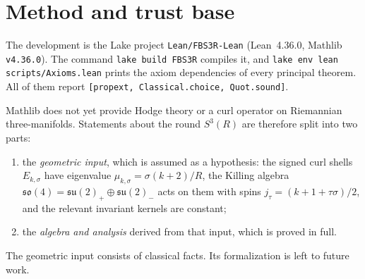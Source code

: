 \documentclass[11pt]{article}
\theoremstyle{remark}
\newcommand{\lean}[1]{\texttt{#1}}
\begin{document}
\begin{abstract}
\begin{itemize}
$F_{n+2}$;
\item the Casimir constant $1/240$ of the conformal scalar on $S^3$ from $\zeta(-3)=1/120$, and an
explicit Kretschmann bound at the Planck boundary;
\item the conformal sign of curvature barriers for Ricci-type flows and a sharp Ricci lower
bound $\mathrm{Ric}\ge-\sqrt{K_0/2}$ under $|\mathrm{Rm}|^2\le K_0$ in dimension three;
\item an energy bound excluding blow-up inside exact finite reducing spaces of quadratic
evolutions;
\item Hankel positivity, log-convexity and the sharp chiral bound $|\Xi|\le2/3$ for positive
spectral measures, and the exact dilation flow $A\,w'=-\mathrm{Var}/3\le0$ of positive
valuation mixtures;
\item the dust-plus-vacuum closure criterion, Einstein-static and turning-point algebra of
residual cosmology;
\item the exact Moore--Ran--Wen gap $\min_{s\in\{\pm1,\pm3\}}(s-m)^2$, the unique-selector
theorem, the angular rank count $N_L-N_{L-q}$, and the logical algebra of the AKLT plaquette
qutrit.
\end{itemize}
A per-paper coverage table classifies all 101 folders of the archive.
We also give machine-checked counterexamples to seven claims made in the archive.
We state explicitly which statements were not formalized, and why.
No open problem (Collatz, Navier--Stokes regularity, the Yang--Mills mass gap, local
connectivity of the Mandelbrot set) is claimed to be solved.
\end{abstract}

\section{Method and trust base}
The development is the Lake project \lean{Lean/FBS3R-Lean} (Lean~4.36.0, Mathlib
\lean{v4.36.0}). The command \lean{lake build FBS3R} compiles it, and
\lean{lake env lean scripts/Axioms.lean} prints the axiom dependencies of every
principal theorem. All of them report \lean{[propext, Classical.choice, Quot.sound]}.

Mathlib does not yet provide Hodge theory or a curl operator on Riemannian three-manifolds.
Statements about the round $S^3(R)$ are therefore split into two parts:
\begin{enumerate}
\item the \emph{geometric input}, which is assumed as a hypothesis: the signed curl shells
$E_{k,\sigma}$ have eigenvalue $\mu_{k,\sigma}=\sigma(k+2)/R$, the Killing algebra
$\mathfrak{so}(4)=\mathfrak{su}(2)_+\oplus\mathfrak{su}(2)_-$ acts on them with spins
$j_\tau=(k+1+\tau\sigma)/2$, and the relevant invariant kernels are constant;
\item the \emph{algebra and analysis} derived from that input, which is proved in full.
\end{enumerate}
The geometric input consists of classical facts. Its formalization is left to future work.
\end{document}
